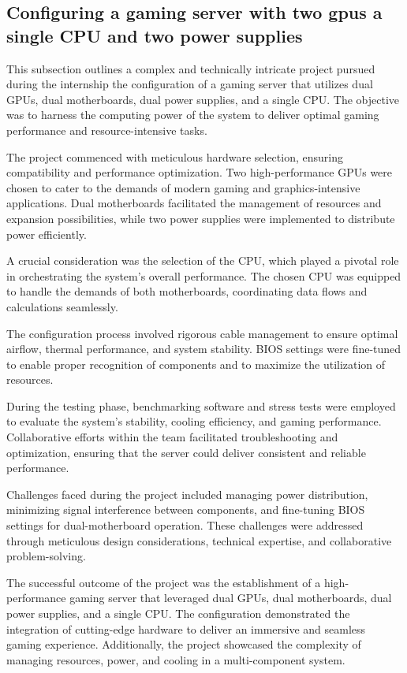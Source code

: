 \subsection{Configuring a gaming server with two gpus a single CPU and two
power supplies}
This subsection outlines a complex and technically intricate project pursued during the internship  the configuration of a gaming server that utilizes dual GPUs, dual motherboards, dual power supplies, and a single CPU. The objective was to harness the computing power of the system to deliver optimal gaming performance and resource-intensive tasks.

The project commenced with meticulous hardware selection, ensuring compatibility and performance optimization. Two high-performance GPUs were chosen to cater to the demands of modern gaming and graphics-intensive applications. Dual motherboards facilitated the management of resources and expansion possibilities, while two power supplies were implemented to distribute power efficiently.

A crucial consideration was the selection of the CPU, which played a pivotal role in orchestrating the system's overall performance. The chosen CPU was equipped to handle the demands of both motherboards, coordinating data flows and calculations seamlessly.

The configuration process involved rigorous cable management to ensure optimal airflow, thermal performance, and system stability. BIOS settings were fine-tuned to enable proper recognition of components and to maximize the utilization of resources.

During the testing phase, benchmarking software and stress tests were employed to evaluate the system's stability, cooling efficiency, and gaming performance. Collaborative efforts within the team facilitated troubleshooting and optimization, ensuring that the server could deliver consistent and reliable performance.

Challenges faced during the project included managing power distribution, minimizing signal interference between components, and fine-tuning BIOS settings for dual-motherboard operation. These challenges were addressed through meticulous design considerations, technical expertise, and collaborative problem-solving.

The successful outcome of the project was the establishment of a high-performance gaming server that leveraged dual GPUs, dual motherboards, dual power supplies, and a single CPU. The configuration demonstrated the integration of cutting-edge hardware to deliver an immersive and seamless gaming experience. Additionally, the project showcased the complexity of managing resources, power, and cooling in a multi-component system.
